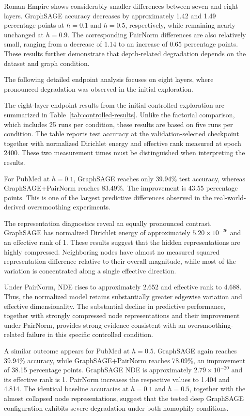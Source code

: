 \documentclass[english]{lni}
\begin{document}
Roman-Empire shows considerably smaller differences between seven and eight layers. GraphSAGE accuracy decreases by approximately 1.42 and 1.49 percentage points at $h=0.1$ and $h=0.5$, respectively, while remaining nearly unchanged at $h=0.9$. The corresponding PairNorm differences are also relatively small, ranging from a decrease of 1.14 to an increase of 0.65 percentage points. These results further demonstrate that depth-related degradation depends on the dataset and graph condition.

The following detailed endpoint analysis focuses on eight layers, where pronounced degradation was observed in the initial exploration.

The eight-layer endpoint results from the initial controlled exploration are summarized in Table~\ref{tab:controlled-results}. Unlike the factorial comparison, which includes 25 runs per condition, these results are based on five runs per condition. The table reports test accuracy at the validation-selected checkpoint together with normalized Dirichlet energy and effective rank measured at epoch 2400. These two measurement times must be distinguished when interpreting the results.

For PubMed at $h=0.1$, GraphSAGE reaches only 39.94\% test accuracy, whereas GraphSAGE+PairNorm reaches 83.49\%. The improvement is 43.55 percentage points. This is one of the largest predictive differences observed in the real-world-derived oversmoothing experiments.

The representation diagnostics reveal an equally pronounced contrast. GraphSAGE has normalized Dirichlet energy of approximately $5.20\times10^{-26}$ and an effective rank of 1. These results suggest that the hidden representations are highly compressed. Neighboring nodes have almost no measured squared representation difference relative to their overall magnitude, while most of the variation is concentrated along a single effective direction.

Under PairNorm, NDE rises to approximately 2.652 and effective rank to 4.688. Thus, the normalized model retains substantially greater edgewise variation and effective dimensionality. The substantial decline in predictive performance, together with strongly compressed node representations and their improvement under PairNorm, provides strong evidence consistent with an oversmoothing-related failure in this specific controlled condition.

A similar outcome appears for PubMed at $h=0.5$. GraphSAGE again reaches 39.94\% accuracy, while GraphSAGE+PairNorm reaches 78.09\%, an improvement of 38.15 percentage points. GraphSAGE NDE is approximately $2.79\times10^{-20}$ and its effective rank is 1. PairNorm increases the respective values to 1.404 and 4.814. The identical baseline accuracies at $h=0.1$ and $h=0.5$, together with the almost collapsed node representations, suggest that the tested deep GraphSAGE configuration exhibits severe degradation under both homophily conditions.
\end{document}
